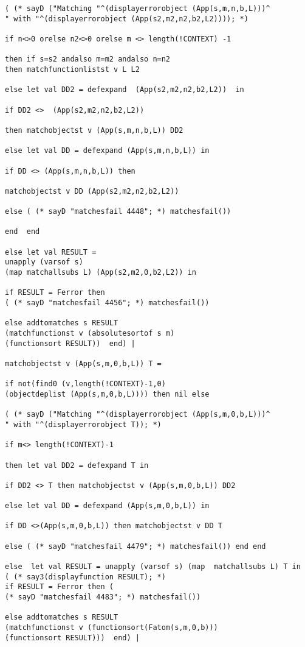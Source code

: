 \documentclass[12pt]{article}
\begin{document}
\begin{verbatim}
( (* sayD ("Matching "^(displayerrorobject (App(s,m,n,b,L)))^
" with "^(displayerrorobject (App(s2,m2,n2,b2,L2)))); *)

if n<>0 orelse n2<>0 orelse m <> length(!CONTEXT) -1 

then if s=s2 andalso m=m2 andalso n=n2 
then matchfunctionlistst v L L2

else let val DD2 = defexpand  (App(s2,m2,n2,b2,L2))  in

if DD2 <>  (App(s2,m2,n2,b2,L2))  

then matchobjectst v (App(s,m,n,b,L)) DD2

else let val DD = defexpand (App(s,m,n,b,L)) in

if DD <> (App(s,m,n,b,L)) then

matchobjectst v DD (App(s2,m2,n2,b2,L2)) 

else ( (* sayD "matchesfail 4448"; *) matchesfail())

end  end

else let val RESULT = 
unapply (varsof s) 
(map matchallsubs L) (App(s2,m2,0,b2,L2)) in

if RESULT = Ferror then 
( (* sayD "matchesfail 4456"; *) matchesfail())

else addtomatches s RESULT 
(matchfunctionst v (absolutesortof s m) 
(functionsort RESULT))  end) |

matchobjectst v (App(s,m,0,b,L)) T =

if not(find0 (v,length(!CONTEXT)-1,0) 
(objectdeplist (App(s,m,0,b,L)))) then nil else

( (* sayD ("Matching "^(displayerrorobject (App(s,m,0,b,L)))^
" with "^(displayerrorobject T)); *)

if m<> length(!CONTEXT)-1 

then let val DD2 = defexpand T in

if DD2 <> T then matchobjectst v (App(s,m,0,b,L)) DD2

else let val DD = defexpand (App(s,m,0,b,L)) in

if DD <>(App(s,m,0,b,L)) then matchobjectst v DD T

else ( (* sayD "matchesfail 4479"; *) matchesfail()) end end

else  let val RESULT = unapply (varsof s) (map  matchallsubs L) T in
( (* say3(displayfunction RESULT); *)
if RESULT = Ferror then ( 
(* sayD "matchesfail 4483"; *) matchesfail())

else addtomatches s RESULT 
(matchfunctionst v (functionsort(Fatom(s,m,0,b))) 
(functionsort RESULT)))  end) |


\end{verbatim}
\end{document}
